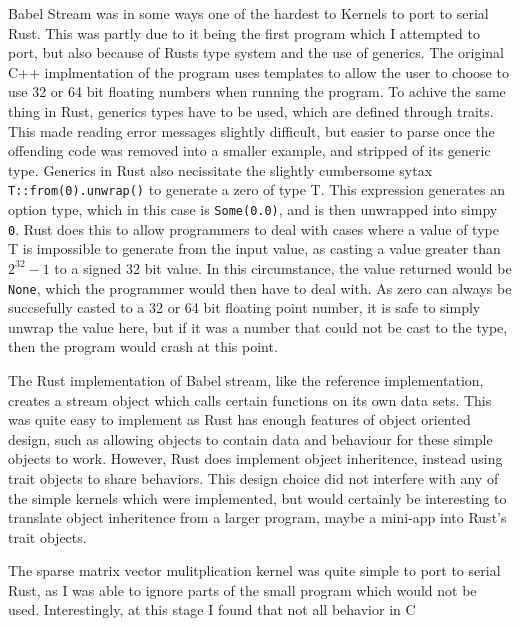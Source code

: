Babel Stream was in some ways one of the hardest to Kernels to port to serial Rust. This was partly due to it being the first program which I attempted to port, but also because of Rusts type system and the use of generics. The original C++ implmentation of the program uses templates to allow the user to choose to use 32 or 64 bit floating numbers when running the program. To achive the same thing in Rust, generics types have to be used, which are defined through traits. This made reading error messages slightly difficult, but easier to parse once the offending code was removed into a smaller example, and stripped of its generic type. Generics in Rust also necissitate the slightly cumbersome sytax \texttt{T::from(0).unwrap()} to generate a zero of type T. This expression generates an option type, which in this case is \texttt{Some(0.0)}, and is then unwrapped into simpy \texttt{0}. Rust does this to allow programmers to deal with cases where a value of type T is impossible to generate from the input value, as casting a value greater than $2^{32} - 1$ to a signed 32 bit value. In this circumstance, the value returned would be \texttt{None}, which the programmer would then have to deal with. As zero can always be succsefully casted to a 32 or 64 bit floating point number, it is safe to simply unwrap the value here, but if it was a number that could not be cast to the type, then the program would crash at this point.

The Rust implementation of Babel stream, like the reference implementation, creates a stream object which calls certain functions on its own data sets. This was quite easy to implement as Rust has enough features of object oriented design, such as allowing objects to contain data and behaviour for these simple objects to work. However, Rust does implement object inheritence, instead using trait objects to share behaviors. This design choice did not interfere with any of the simple kernels which were implemented, but would certainly be interesting to translate object inheritence from a larger program, maybe a mini-app into Rust's trait objects.

The sparse matrix vector mulitplication kernel was quite simple to port to serial Rust, as I was able to ignore parts of the small program which would not be used. Interestingly, at this stage I found that not all behavior in C

